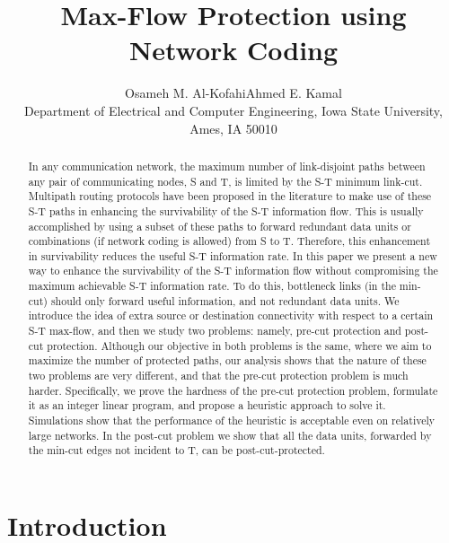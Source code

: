 \documentclass[conference]{IEEEtran}
\title{Max-Flow Protection using Network Coding}
\author{Osameh M. Al-Kofahi\hspace{1 in}Ahmed E. Kamal\\Department of Electrical and Computer Engineering, Iowa State University, Ames, IA 50010}
\begin{document}
\maketitle

\begin{abstract}

In any communication network, the maximum number of link-disjoint paths between any pair of communicating nodes, S and T, is limited by the S-T minimum link-cut. Multipath routing protocols have been proposed in the literature to make use of these S-T paths in enhancing the survivability of the S-T information flow. This is usually accomplished by using a subset of these paths to forward redundant data units or combinations (if network coding is allowed) from S to T. Therefore, this enhancement in survivability reduces the useful S-T information rate. In this paper we present a new way to enhance the survivability of the S-T information flow without compromising the maximum achievable S-T information rate. To do this, bottleneck links (in the min-cut) should only forward useful information, and not redundant data units. We introduce the idea of extra source or destination connectivity with respect to a certain S-T max-flow, and then we study two problems: namely, pre-cut protection and post-cut protection. Although our objective in both problems is the same, where we aim to maximize the number of protected paths, our analysis shows that the nature of these two problems are very different, and that the pre-cut protection problem is much harder. Specifically, we prove the hardness of the pre-cut protection problem, formulate it as an integer linear program, and propose a heuristic approach to solve it. Simulations show that the performance of the heuristic is acceptable even on relatively large networks. In the post-cut problem we show that all the data units, forwarded by the min-cut edges not incident to T, can be post-cut-protected.
\end{abstract}

\section{Introduction}
\label{intro}
\end{document}
